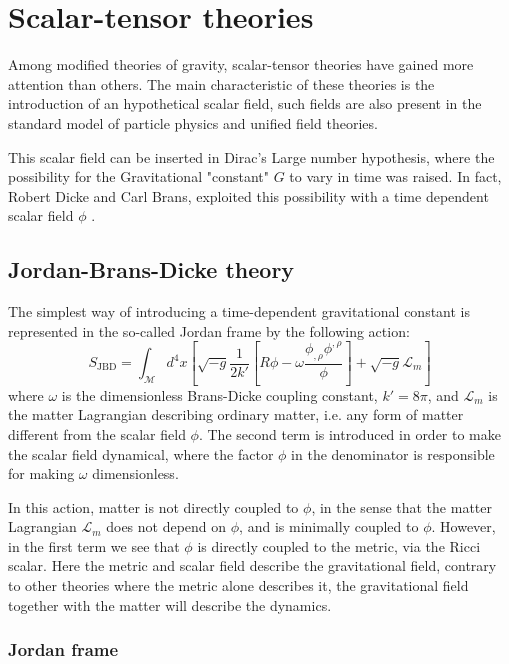  \chapter{Scalar-tensor theories}

Among modified theories of gravity, scalar-tensor theories have gained more attention than others. 
The main characteristic of these theories is the introduction of an hypothetical scalar field, such fields are also present in the standard model of particle physics and unified field theories.

This scalar field can be inserted in Dirac's Large number hypothesis, where the possibility for the Gravitational "constant" $G$ to vary in time was raised.
In fact, Robert Dicke and Carl Brans, exploited this possibility with a time dependent scalar field $\phi$ \cite{Brans_1961}.

\section{Jordan-Brans-Dicke theory}

The simplest way of introducing a time-dependent gravitational constant is represented in the so-called Jordan frame by the following action:
\begin{equation}
    S_{\text{JBD}}=\int_{\mathcal{M}} d^4x\left[ \sqrt{-g}\frac{1}{2k'}\left[R\phi-\omega \frac{\phi_{,\rho}\phi^{,\rho}}{\phi}\right]+\sqrt{-g}\mathcal{L}_m\right]
    \label{eqn:BD_action_JF}
\end{equation}
where $\omega$ is the dimensionless Brans-Dicke coupling constant, $k'=8\pi$, and $\mathcal{L}_m$ is the matter Lagrangian describing ordinary matter, i.e. any form of matter different from the scalar field $\phi$. The second term is introduced in order to make the scalar field dynamical, where the factor $\phi$ in the denominator is responsible for making $\omega$ dimensionless.

In this action, matter is not directly coupled to $\phi$, in the sense that the matter Lagrangian $\mathcal{L}_m$ does not depend on $\phi$, and is minimally coupled to $\phi$. However, in the first term we see that $\phi$ is directly coupled to the metric, via the Ricci scalar. Here the metric and scalar field describe the gravitational field, contrary to other theories where the metric alone describes it, the gravitational field together with the matter will describe the dynamics. 

\subsection{Jordan frame}

